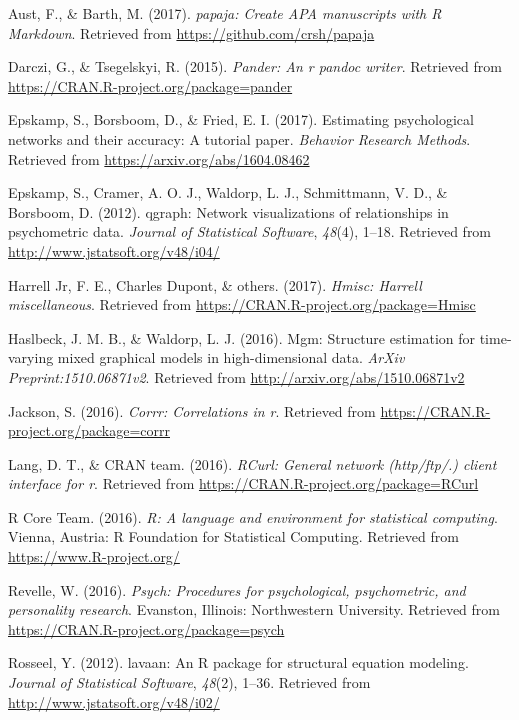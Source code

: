 \documentclass[english,man]{apa6}
\theoremstyle{definition}
\theoremstyle{definition}
\theoremstyle{remark}
\begin{document}
\hypertarget{refs}{}
\hypertarget{ref-R-papaja}{}
Aust, F., \& Barth, M. (2017). \emph{papaja: Create APA manuscripts with
R Markdown}. Retrieved from \url{https://github.com/crsh/papaja}

\hypertarget{ref-R-pander}{}
Darczi, G., \& Tsegelskyi, R. (2015). \emph{Pander: An r pandoc writer}.
Retrieved from \url{https://CRAN.R-project.org/package=pander}

\hypertarget{ref-R-bootnet}{}
Epskamp, S., Borsboom, D., \& Fried, E. I. (2017). Estimating
psychological networks and their accuracy: A tutorial paper.
\emph{Behavior Research Methods}. Retrieved from
\url{https://arxiv.org/abs/1604.08462}

\hypertarget{ref-R-qgraph}{}
Epskamp, S., Cramer, A. O. J., Waldorp, L. J., Schmittmann, V. D., \&
Borsboom, D. (2012). qgraph: Network visualizations of relationships in
psychometric data. \emph{Journal of Statistical Software}, \emph{48}(4),
1--18. Retrieved from \url{http://www.jstatsoft.org/v48/i04/}

\hypertarget{ref-R-Hmisc}{}
Harrell Jr, F. E., Charles Dupont, \& others. (2017). \emph{Hmisc:
Harrell miscellaneous}. Retrieved from
\url{https://CRAN.R-project.org/package=Hmisc}

\hypertarget{ref-R-mgm}{}
Haslbeck, J. M. B., \& Waldorp, L. J. (2016). Mgm: Structure estimation
for time-varying mixed graphical models in high-dimensional data.
\emph{ArXiv Preprint:1510.06871v2}. Retrieved from
\url{http://arxiv.org/abs/1510.06871v2}

\hypertarget{ref-R-corrr}{}
Jackson, S. (2016). \emph{Corrr: Correlations in r}. Retrieved from
\url{https://CRAN.R-project.org/package=corrr}

\hypertarget{ref-R-RCurl}{}
Lang, D. T., \& CRAN team. (2016). \emph{RCurl: General network
(http/ftp/.) client interface for r}. Retrieved from
\url{https://CRAN.R-project.org/package=RCurl}

\hypertarget{ref-R-base}{}
R Core Team. (2016). \emph{R: A language and environment for statistical
computing}. Vienna, Austria: R Foundation for Statistical Computing.
Retrieved from \url{https://www.R-project.org/}

\hypertarget{ref-R-psych}{}
Revelle, W. (2016). \emph{Psych: Procedures for psychological,
psychometric, and personality research}. Evanston, Illinois:
Northwestern University. Retrieved from
\url{https://CRAN.R-project.org/package=psych}

\hypertarget{ref-R-lavaan}{}
Rosseel, Y. (2012). lavaan: An R package for structural equation
modeling. \emph{Journal of Statistical Software}, \emph{48}(2), 1--36.
Retrieved from \url{http://www.jstatsoft.org/v48/i02/}
\end{document}
